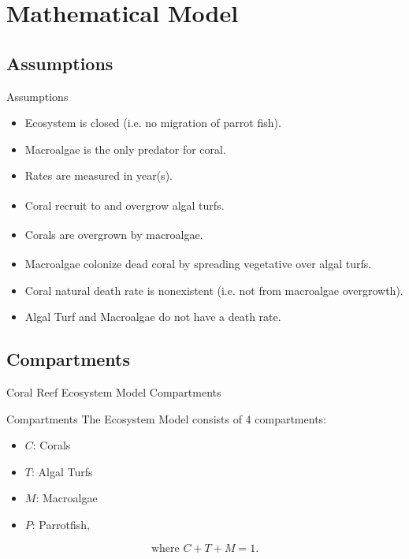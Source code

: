 \documentclass{beamer}
\begin{document}


\section{Mathematical Model} %
\subsection{Assumptions}
\begin{frame}{Assumptions}
    \begin{itemize}
        \item Ecosystem is closed (i.e. no migration of parrot fish).
        \item Macroalgae is the only predator for coral.
        \item Rates are measured in year(s).
        \item Coral recruit to and overgrow algal turfs\textsuperscript{\cite{04_mathanalysis}}.
        \item Corals are overgrown by macroalgae\textsuperscript{\cite{04_mathanalysis}}.
        \item Macroalgae colonize dead coral by spreading vegetative over algal turfs\textsuperscript{\cite{04_mathanalysis}}.
        \item Coral natural death rate is nonexistent (i.e. not from macroalgae overgrowth).
        \item Algal Turf and Macroalgae do not have a death rate.
    \end{itemize}
\end{frame}

\subsection{Compartments}
\begin{frame}{Coral Reef Ecosystem Model Compartments}
    \begin{block}{Compartments}
    The Ecosystem Model consists of 4 compartments:
        \begin{itemize}
        \item \small{$C$: Corals}
        \item \small{$T$: Algal Turfs}
        \item \small{$M$: Macroalgae}
        \item \small{$P$: Parrotfish},
        \end{itemize}
        $$ \text{where } C + T + M = 1.$$
    \end{block}
\end{frame}
\end{document}
